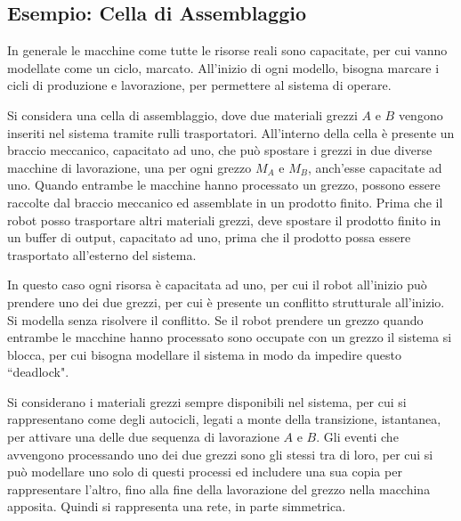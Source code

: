 \documentclass{article}
\numberwithin{equation}{subsection}
\begin{document}
\subsection{Esempio: Cella di Assemblaggio}

In generale le macchine come tutte le risorse reali sono capacitate, per cui vanno modellate come un ciclo, marcato. All'inizio di ogni modello, bisogna marcare i cicli di 
produzione e lavorazione, per permettere al sistema di operare. 

Si considera una cella di assemblaggio, dove due materiali grezzi $A$ e $B$ vengono inseriti nel sistema tramite rulli trasportatori. All'interno della cella è presente un 
braccio meccanico, capacitato ad uno, che può spostare i grezzi in due diverse macchine di lavorazione, una per ogni grezzo $M_A$ e $M_B$, anch'esse capacitate ad uno. 
Quando entrambe le macchine hanno processato un grezzo, possono essere raccolte dal braccio meccanico ed assemblate in un prodotto finito. Prima che il robot posso trasportare 
altri materiali grezzi, deve spostare il prodotto finito in un buffer di output, capacitato ad uno, prima che il prodotto possa essere trasportato all'esterno del sistema. 

In questo caso ogni risorsa è capacitata ad uno, per cui il robot all'inizio può prendere uno dei due grezzi, per cui è presente un conflitto strutturale all'inizio. Si 
modella senza risolvere il conflitto. Se il robot prendere un grezzo quando entrambe le macchine hanno processato sono occupate con un grezzo il sistema si blocca, per cui 
bisogna modellare il sistema in modo da impedire questo ``deadlock". 

Si considerano i materiali grezzi sempre disponibili nel sistema, per cui si rappresentano come degli autocicli, legati a monte della transizione, istantanea, per attivare 
una delle due sequenza di lavorazione $A$ e $B$. Gli eventi che avvengono processando uno dei due grezzi sono gli stessi tra di loro, per cui si può modellare uno solo di 
questi processi ed includere una sua copia per rappresentare l'altro, fino alla fine della lavorazione del grezzo nella macchina apposita. Quindi si rappresenta una 
rete, in parte simmetrica. 
\end{document}
